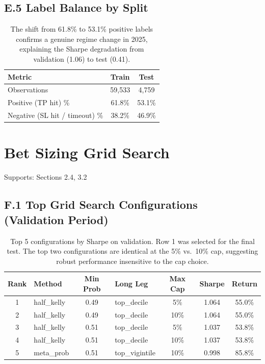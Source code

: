 \documentclass[11pt, a4paper]{article}
\begin{document}
\subsection*{E.5 Label Balance by Split}
\begin{table}[h]
\centering
\begin{tabular}{lcc}
\toprule
\textbf{Metric} & \textbf{Train} & \textbf{Test} \\
\midrule
Observations & 59,533 & 4,759 \\
Positive (TP hit) \% & 61.8\% & 53.1\% \\
Negative (SL hit / timeout) \% & 38.2\% & 46.9\% \\
\bottomrule
\end{tabular}
\caption{The shift from 61.8\% to 53.1\% positive labels confirms a genuine regime change in 2025, explaining the Sharpe degradation from validation (1.06) to test (0.41).}
\end{table}

\clearpage
\section{Bet Sizing Grid Search}
Supports: Sections 2.4, 3.2

\subsection*{F.1 Top Grid Search Configurations (Validation Period)}
\begin{table}[h]
\centering
\begin{tabular}{clclccc}
\toprule
\textbf{Rank} & \textbf{Method} & \textbf{Min Prob} & \textbf{Long Leg} & \textbf{Max Cap} & \textbf{Sharpe} & \textbf{Return} \\
\midrule
1 & half\_kelly & 0.49 & top\_decile & 5\% & 1.064 & 55.0\% \\
2 & half\_kelly & 0.49 & top\_decile & 10\% & 1.064 & 55.0\% \\
3 & half\_kelly & 0.51 & top\_decile & 5\% & 1.037 & 53.8\% \\
4 & half\_kelly & 0.51 & top\_decile & 10\% & 1.037 & 53.8\% \\
5 & meta\_prob & 0.51 & top\_vigintile & 10\% & 0.998 & 85.8\% \\
\bottomrule
\end{tabular}
\caption{Top 5 configurations by Sharpe on validation. Row 1 was selected for the final test. The top two configurations are identical at the 5\% vs.\ 10\% cap, suggesting robust performance insensitive to the cap choice.}
\end{table}
\end{document}
